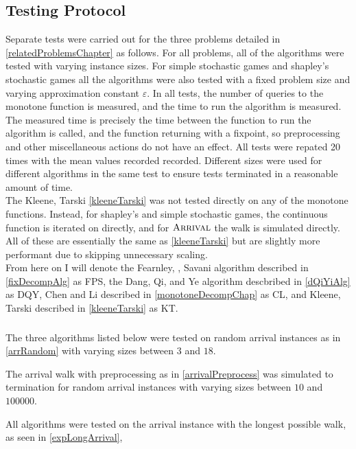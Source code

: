 \subsection{Testing Protocol}
Separate tests were carried out for the three problems detailed in \cref{relatedProblemsChapter} as follows.
For all problems, all of the algorithms were tested with varying instance sizes. For simple stochastic games
and shapley's stochastic games all the algorithms were also tested with a fixed problem size and varying
approximation constant $\varepsilon$. In all tests, the number of queries to the monotone function is
measured, and the time to run the algorithm is measured. The measured time is precisely the time between
the function to run the algorithm is called, and the function returning with a fixpoint, so preprocessing
and other miscellaneous actions do not have an effect. All tests were repated 20 times with the
mean values recorded recorded. Different sizes were used for different algorithms in the same test
to ensure tests terminated in a reasonable amount of time. \\
The Kleene, Tarski \cref{kleeneTarski} was not tested directly on any of the monotone functions.
Instead, for shapley's and simple stochastic games, the continuous function is iterated on directly,
and for $\textsc{Arrival}$ the walk is simulated directly. All of these are essentially the same as \cref{kleeneTarski}
but are slightly more performant due to skipping unnecessary scaling. \\
From here on I will denote the Fearnley, \pav, Savani algorithm described in \cref{fixDecompAlg}
as FPS, the Dang, Qi, and Ye algorithm descbribed in \cref{dQiYiAlg} as
DQY, Chen and Li described in \cref{monotoneDecompChap} as CL, and Kleene, Tarski 
described in \cref{kleeneTarski} as KT.
\subsubsection{\arr}
\begin{test} \label{arrMainTest}
  The three algorithms listed below were tested on random arrival instances as in \cref{arrRandom}
  with varying sizes between $3$ and $18$.
\end{test}
\begin{test} \label{arrWalkTest}
  The arrival walk with preprocessing as in \cref{arrivalPreprocess} 
  was simulated to termination for random arrival instances with varying sizes
  between $10$ and $100000$.
\end{test}
\begin{test} \label{longArrivalTest}
  All algorithms were tested on the arrival instance with the
  longest possible walk, as seen in \cref{expLongArrival},
\end{test}
